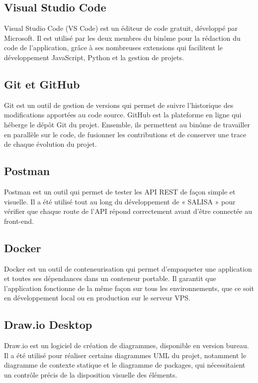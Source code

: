 \subsection*{\textcolor{vertCongo}{Visual Studio Code}}

Visual Studio Code (VS Code) est un éditeur de code gratuit, développé par Microsoft. Il est utilisé par les deux membres du binôme pour la rédaction du code de l'application, grâce à ses nombreuses extensions qui facilitent le développement JavaScript, Python et la gestion de projets.

\subsection*{\textcolor{vertCongo}{Git et GitHub}}

Git est un outil de gestion de versions qui permet de suivre l'historique des modifications apportées au code source. GitHub est la plateforme en ligne qui héberge le dépôt Git du projet. Ensemble, ils permettent au binôme de travailler en parallèle sur le code, de fusionner les contributions et de conserver une trace de chaque évolution du projet.

\subsection*{\textcolor{vertCongo}{Postman}}

Postman est un outil qui permet de tester les API REST de façon simple et visuelle. Il a été utilisé tout au long du développement de « SALISA » pour vérifier que chaque route de l'API répond correctement avant d'être connectée au front-end.

\subsection*{\textcolor{vertCongo}{Docker}}

Docker est un outil de conteneurisation qui permet d'empaqueter une application et toutes ses dépendances dans un conteneur portable. Il garantit que l'application fonctionne de la même façon sur tous les environnements, que ce soit en développement local ou en production sur le serveur VPS.

\subsection*{\textcolor{vertCongo}{Draw.io Desktop}}

Draw.io est un logiciel de création de diagrammes, disponible en version bureau. Il a été utilisé pour réaliser certains diagrammes UML du projet, notamment le diagramme de contexte statique et le diagramme de packages, qui nécessitaient un contrôle précis de la disposition visuelle des éléments.


